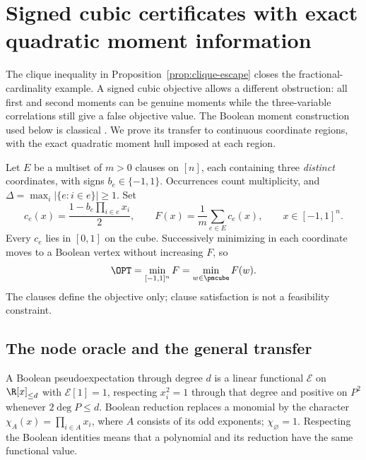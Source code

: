 \section{Signed cubic certificates with exact quadratic moment information}
\label{sec:xor-quadratic}
The clique inequality in Proposition~\ref{prop:clique-escape} closes the
fractional-cardinality example. A signed cubic objective allows a different
obstruction: all first and second moments can be genuine moments while
the three-variable correlations still give a false objective value. The
Boolean moment construction used below is classical
\citep{Schoenebeck2008}. We prove its transfer to continuous coordinate
regions, with the exact quadratic moment hull imposed at each region.

Let $E$ be a multiset of $m>0$ clauses on $[n]$, each containing three
\emph{distinct} coordinates, with signs $b_e\in\{-1,1\}$. Occurrences count
multiplicity, and $\Delta=\max_i|\{e:i\in e\}|\ge1$. Set
\begin{equation}\label{eq:xor-objective}
 c_e(x)=\frac{1-b_e\prod_{i\in e}x_i}{2},\qquad
 F(x)=\frac1m\sum_{e\in E}c_e(x),\qquad x\in[-1,1]^n.
\end{equation}
Every $c_e$ lies in $[0,1]$ on the cube. Successively minimizing in each
coordinate moves to a Boolean vertex without increasing $F$, so
\begin{equation}\label{eq:xor-vertex-min}
 \OPT=\min_{[-1,1]^n}F=\min_{w\in\pmcube}F(w).
\end{equation}
The clauses define the objective only; clause satisfaction is not a
feasibility constraint.

\subsection{The node oracle and the general transfer}
A Boolean pseudoexpectation through degree $d$ is a linear functional
$\mathcal E$ on $\R[x]_{\le d}$ with $\mathcal E[1]=1$, respecting
$x_i^2=1$ through that degree and positive on $P^2$ whenever
$2\deg P\le d$. Boolean reduction replaces a monomial by the character
$\chi_A(x)=\prod_{i\in A}x_i$, where $A$ consists of its odd exponents;
$\chi_\varnothing=1$. Respecting the Boolean identities means that a
polynomial and its reduction have the same functional value.

